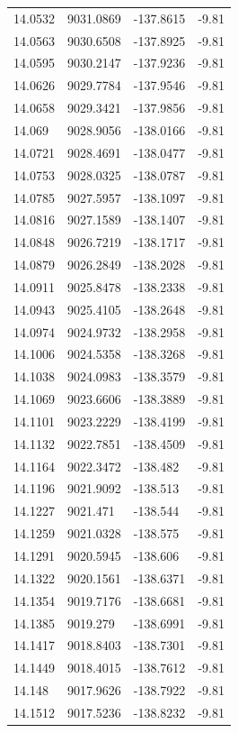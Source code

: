 \begin{table}[H]
\begin{tabular}{llll}
14.0532 & 9031.0869 & -137.8615 & -9.81 \\
14.0563 & 9030.6508 & -137.8925 & -9.81 \\
14.0595 & 9030.2147 & -137.9236 & -9.81 \\
14.0626 & 9029.7784 & -137.9546 & -9.81 \\
14.0658 & 9029.3421 & -137.9856 & -9.81 \\
14.069 & 9028.9056 & -138.0166 & -9.81 \\
14.0721 & 9028.4691 & -138.0477 & -9.81 \\
14.0753 & 9028.0325 & -138.0787 & -9.81 \\
14.0785 & 9027.5957 & -138.1097 & -9.81 \\
14.0816 & 9027.1589 & -138.1407 & -9.81 \\
14.0848 & 9026.7219 & -138.1717 & -9.81 \\
14.0879 & 9026.2849 & -138.2028 & -9.81 \\
14.0911 & 9025.8478 & -138.2338 & -9.81 \\
14.0943 & 9025.4105 & -138.2648 & -9.81 \\
14.0974 & 9024.9732 & -138.2958 & -9.81 \\
14.1006 & 9024.5358 & -138.3268 & -9.81 \\
14.1038 & 9024.0983 & -138.3579 & -9.81 \\
14.1069 & 9023.6606 & -138.3889 & -9.81 \\
14.1101 & 9023.2229 & -138.4199 & -9.81 \\
14.1132 & 9022.7851 & -138.4509 & -9.81 \\
14.1164 & 9022.3472 & -138.482 & -9.81 \\
14.1196 & 9021.9092 & -138.513 & -9.81 \\
14.1227 & 9021.471 & -138.544 & -9.81 \\
14.1259 & 9021.0328 & -138.575 & -9.81 \\
14.1291 & 9020.5945 & -138.606 & -9.81 \\
14.1322 & 9020.1561 & -138.6371 & -9.81 \\
14.1354 & 9019.7176 & -138.6681 & -9.81 \\
14.1385 & 9019.279 & -138.6991 & -9.81 \\
14.1417 & 9018.8403 & -138.7301 & -9.81 \\
14.1449 & 9018.4015 & -138.7612 & -9.81 \\
14.148 & 9017.9626 & -138.7922 & -9.81 \\
14.1512 & 9017.5236 & -138.8232 & -9.81 \\

\end{tabular}
\end{table}
